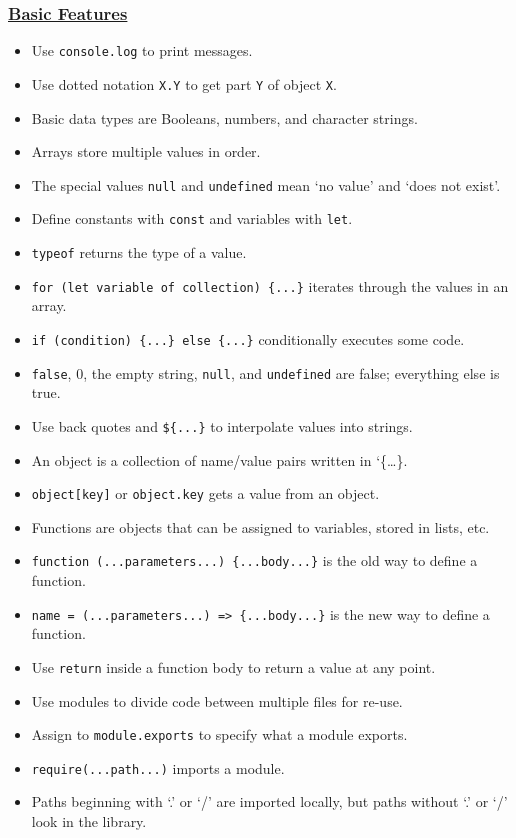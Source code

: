 \subsubsection{\texorpdfstring{\protect\hyperlink{s:basics}{Basic
Features}}{Basic Features}}\label{null}

\begin{itemize}
\tightlist
\item
  Use \texttt{console.log} to print messages.
\item
  Use dotted notation \texttt{X.Y} to get part \texttt{Y} of object
  \texttt{X}.
\item
  Basic data types are Booleans, numbers, and character strings.
\item
  Arrays store multiple values in order.
\item
  The special values \texttt{null} and \texttt{undefined} mean `no
  value' and `does not exist'.
\item
  Define constants with \texttt{const} and variables with \texttt{let}.
\item
  \texttt{typeof} returns the type of a value.
\item
  \texttt{for\ (let\ variable\ of\ collection)\ \{...\}} iterates
  through the values in an array.
\item
  \texttt{if\ (condition)\ \{...\}\ else\ \{...\}} conditionally
  executes some code.
\item
  \texttt{false}, 0, the empty string, \texttt{null}, and
  \texttt{undefined} are false; everything else is true.
\item
  Use back quotes and \texttt{\$\{...\}} to interpolate values into
  strings.
\item
  An object is a collection of name/value pairs written in
  `\{\ldots{}\}.
\item
  \texttt{object{[}key{]}} or \texttt{object.key} gets a value from an
  object.
\item
  Functions are objects that can be assigned to variables, stored in
  lists, etc.
\item
  \texttt{function\ (...parameters...)\ \{...body...\}} is the old way
  to define a function.
\item
  \texttt{name\ =\ (...parameters...)\ =\textgreater{}\ \{...body...\}}
  is the new way to define a function.
\item
  Use \texttt{return} inside a function body to return a value at any
  point.
\item
  Use modules to divide code between multiple files for re-use.
\item
  Assign to \texttt{module.exports} to specify what a module exports.
\item
  \texttt{require(...path...)} imports a module.
\item
  Paths beginning with `.' or `/' are imported locally, but paths
  without `.' or `/' look in the library.
\end{itemize}

